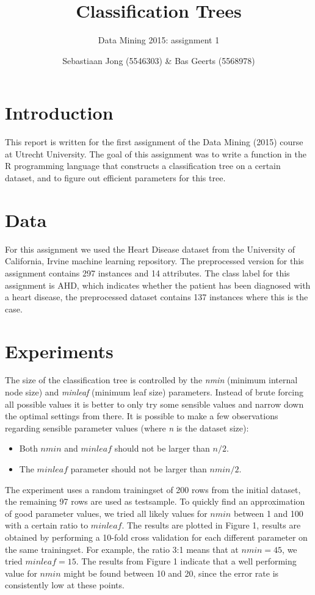 \documentclass[a4paper,12pt]{scrartcl}
\begin{document}
\title{Classification Trees}
\subtitle{Data Mining 2015: assignment 1}
\author{Sebastiaan Jong (5546303) \& Bas Geerts (5568978)}
\date{}
\maketitle
\section{Introduction}
This report is written for the first assignment of the Data Mining (2015) course at Utrecht University. The goal of this assignment was to write a function in the R programming language that constructs a classification tree on a certain dataset, and to figure out efficient parameters for this tree.
\section{Data}
For this assignment we used the Heart Disease dataset from the University of California, Irvine machine learning repository. The preprocessed version for this assignment contains 297 instances and 14 attributes. The class label for this assignment is AHD, which indicates whether the patient has been diagnosed with a heart disease, the preprocessed dataset contains 137 instances where this is the case.

\section{Experiments}
The size of the classification tree is controlled by the \textit{nmin} (minimum internal node size) and \textit{minleaf} (minimum leaf size) parameters. Instead of brute forcing all possible values it is better to only try some sensible values and narrow down the optimal settings from there. It is possible to make a few observations regarding sensible parameter values (where \textit{n} is the dataset size): 
    \begin{itemize}
        \item Both $nmin$ and $minleaf$ should not be larger than $n/2$.
        \item The $minleaf$ parameter should not be larger than $nmin/2$. 
    \end{itemize}
The experiment uses a random trainingset of 200 rows from the initial dataset, the remaining 97 rows are used as testsample.
To quickly find an approximation of good parameter values, we tried all likely values for $nmin$ between 1 and 100 with a certain ratio to $minleaf$. The results are plotted in Figure 1, results are obtained by performing a 10-fold cross validation for each different parameter on the same trainingset. For example, the ratio 3:1 means that at $nmin = 45$, we tried $minleaf = 15$. The results from Figure 1 indicate that a well performing value for $nmin$ might be found between 10 and 20, since the error rate is consistently low at these points. 
\end{document}
